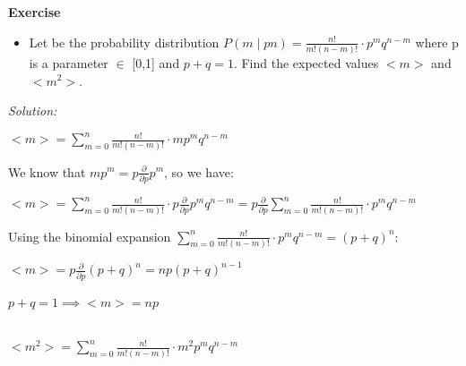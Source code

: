 \documentclass[paper=9in:6in,pagesize=pdftex,headinclude=on,footinclude=on,10pt,bibtotoc,pointlessnumbers,normalheadings,DIV=9,twoside=false]{scrbook}
\begin{document}
\date{}


\begin{large} 
 \textbf{Exercise}
\end{large} 
\begin{itemize} 
\item Let be the probability distribution $P(m\mid pn) = \frac{n!}{m!(n-m)!} \cdot p^m q^{n-m}$ where p is a parameter $\in$ [0,1] and $p+q=1$. Find the expected values $<m>$ and $<m^2>$.
\end{itemize}

\begin{large}
\textit{Solution:\\}
\end{large}

 \begin{center}
    $<m> = \sum\limits_{m=0}^{n} \frac{n!}{m!(n-m)!} \cdot m p^m q^{n-m}$ \\
 \end{center}
 
\begin{text}
We know that $m p^m = p \frac{\partial}{\partial p} p^m $, so we have: \\ 
\end{text}

\begin{center}
$<m> = \sum\limits_{m=0}^{n} \frac{n!}{m!(n-m)!} \cdot p \frac{\partial}{\partial p} p^m q^{n-m} = p \frac{\partial}{\partial p} \sum\limits_{m=0}^{n} \frac{n!}{m!(n-m)!} \cdot  p^m q^{n-m} $ \\
\end{center}

\begin{text}
Using the binomial expansion  $\sum\limits_{m=0}^{n} \frac{n!}{m!(n-m)!} \cdot  p^m q^{n-m} = (p+q)^n  $: \\
\end{text}

\begin{center}
$<m>= p \frac{\partial}{\partial p} (p+q)^n = np(p+q)^{n-1} $\\
\ \\

$p+q=1 \implies <m> = np$ \\
\end{center}


\begin{center}
\ \\ $<m^2> = \sum\limits_{m=0}^{n} \frac{n!}{m!(n-m)!} \cdot m^2 p^m q^{n-m}$ \\
\end{center}
\end{document}
